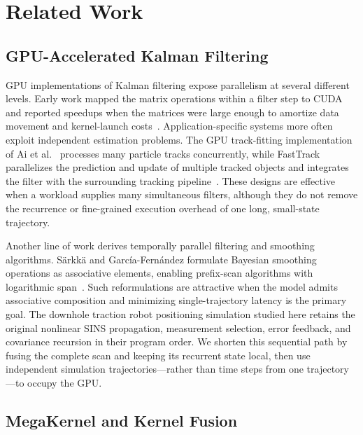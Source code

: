 \section{Related Work}
\label{sec:related-work}

\subsection{GPU-Accelerated Kalman Filtering}
\label{subsec:related-kalman}

GPU implementations of Kalman filtering expose parallelism at several different levels. Early work mapped the matrix operations within a filter step to CUDA and reported speedups when the matrices were large enough to amortize data movement and kernel-launch costs~\cite{huang2011gpu-kalman}. Application-specific systems more often exploit independent estimation problems. The GPU track-fitting implementation of Ai et al.~\cite{ai2021gpu-kalman} processes many particle tracks concurrently, while FastTrack parallelizes the prediction and update of multiple tracked objects and integrates the filter with the surrounding tracking pipeline~\cite{liu2024fasttrack}. These designs are effective when a workload supplies many simultaneous filters, although they do not remove the recurrence or fine-grained execution overhead of one long, small-state trajectory.

Another line of work derives temporally parallel filtering and smoothing algorithms. S\"arkk\"a and Garc\'ia-Fern\'andez formulate Bayesian smoothing operations as associative elements, enabling prefix-scan algorithms with logarithmic span~\cite{sarkka2021temporal}. Such reformulations are attractive when the model admits associative composition and minimizing single-trajectory latency is the primary goal. The downhole traction robot positioning simulation studied here retains the original nonlinear SINS propagation, measurement selection, error feedback, and covariance recursion in their program order. We shorten this sequential path by fusing the complete scan and keeping its recurrent state local, then use independent simulation trajectories---rather than time steps from one trajectory---to occupy the GPU.

\subsection{MegaKernel and Kernel Fusion}
\label{subsec:related-fusion}

